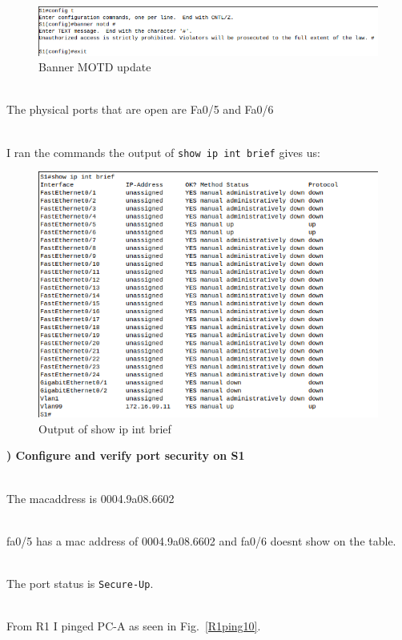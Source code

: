 \documentclass{report}
\newcommand{\mysubsection}[2]{\textbf{\romannumeral #1) #2}}
\begin{document}
\begin{figure}[!hbt]\centering
\includegraphics[width=.75\linewidth]{Figures/2020-02-26-035114_701x102_scrot.png}\par
\caption{Banner MOTD update}
\label{Banner10}
\end{figure}

\\The physical ports that are open are Fa0/5 and Fa0/6


\\I ran the commands the output of 
{\scriptsize{\verb$show ip int brief$}\normalsize} gives us:


\begin{figure}[!hbt]\centering
\includegraphics[width=.69\linewidth]{Figures/2020-02-26-040122_601x435_scrot.png}\par
\caption{Output of show ip int brief }
\label{Intbrief10}
\end{figure}

\clearpage

\noindent\mysubsection{10}{Configure and verify port security on S1}


\\The macaddress is 0004.9a08.6602


\\fa0/5 has a mac address of 0004.9a08.6602 and fa0/6 doesnt show on the table.


\\The port status is {\scriptsize{\verb$Secure-Up$}\normalsize}.


\\From R1 I pinged PC-A as seen in Fig.~\ref{R1ping10}.
\end{document}
